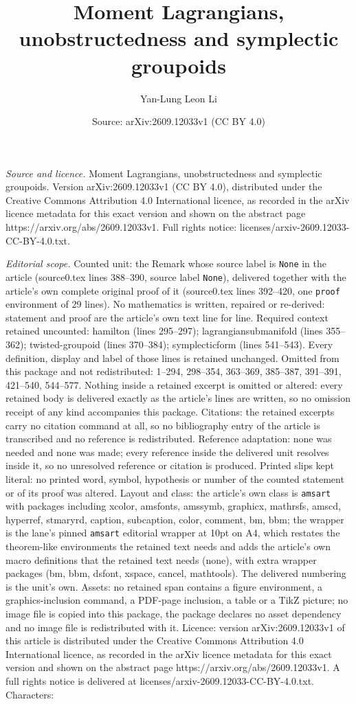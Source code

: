 \documentclass[10pt,a4paper]{amsart}
\title[Moment Lagrangians, unobstructedness and symplectic groupoid]{Moment Lagrangians, unobstructedness and symplectic groupoids}
\author{Yan-Lung Leon Li}
\date{Source: arXiv:2609.12033v1 (CC BY 4.0)}
\begin{document}
\maketitle

\noindent\emph{Source and licence.} Moment Lagrangians, unobstructedness and symplectic groupoids. Version arXiv:2609.12033v1 (CC BY 4.0), distributed under the Creative Commons Attribution 4.0 International licence, as recorded in the arXiv licence metadata for this exact version and shown on the abstract page https://arxiv.org/abs/2609.12033v1. Full rights notice: licenses/arxiv-2609.12033-CC-BY-4.0.txt.\par\smallskip

\noindent\textit{Editorial scope.} Counted unit: the Remark whose source label is \texttt{None} in the article (source0.tex lines 388--390, source label \texttt{None}), delivered together with the article's own complete original proof of it (source0.tex lines 392--420, one \texttt{proof} environment of 29 lines). No mathematics is written, repaired or re-derived: statement and proof are the article's own text line for line. Required context retained uncounted: hamilton (lines 295--297); lagrangiansubmanifold (lines 355--362); twisted-groupoid (lines 370--384); symplecticform (lines 541--543). Every definition, display and label of those lines is retained unchanged. Omitted from this package and not redistributed: 1--294, 298--354, 363--369, 385--387, 391--391, 421--540, 544--577. Nothing inside a retained excerpt is omitted or altered: every retained body is delivered exactly as the article's lines are written, so no omission receipt of any kind accompanies this package. Citations: the retained excerpts carry no citation command at all, so no bibliography entry of the article is transcribed and no reference is redistributed. Reference adaptation: none was needed and none was made; every reference inside the delivered unit resolves inside it, so no unresolved reference or citation is produced. Printed slips kept literal: no printed word, symbol, hypothesis or number of the counted statement or of its proof was altered. Layout and class: the article's own class is \texttt{amsart} with packages including xcolor, amsfonts, amssymb, graphicx, mathrsfs, amscd, hyperref, stmaryrd, caption, subcaption, color, comment, bm, bbm; the wrapper is the lane's pinned \texttt{amsart} editorial wrapper at 10pt on A4, which restates the theorem-like environments the retained text needs and adds the article's own macro definitions that the retained text needs (none), with extra wrapper packages (bm, bbm, dsfont, xspace, cancel, mathtools). The delivered numbering is the unit's own. Assets: no retained span contains a figure environment, a graphics-inclusion command, a PDF-page inclusion, a table or a TikZ picture; no image file is copied into this package, the package declares no asset dependency and no image file is redistributed with it. Licence: version arXiv:2609.12033v1 of this article is distributed under the Creative Commons Attribution 4.0 International licence, as recorded in the arXiv licence metadata for this exact version and shown on the abstract page https://arxiv.org/abs/2609.12033v1. A full rights notice is delivered at licenses/arxiv-2609.12033-CC-BY-4.0.txt. Characters: 
\end{document}
